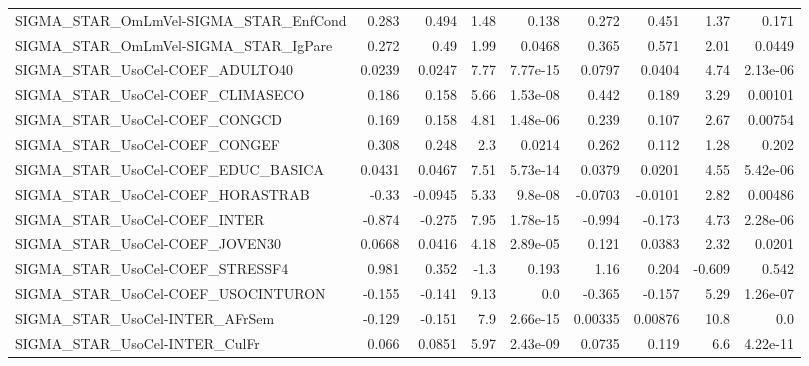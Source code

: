 \begin{tabular}{lrrrrrrrr}
SIGMA\_STAR\_OmLmVel-SIGMA\_STAR\_EnfCond &       0.283 &        0.494 &    1.48 &    0.138 &      0.272 &       0.451 &         1.37 &         0.171 \\
SIGMA\_STAR\_OmLmVel-SIGMA\_STAR\_IgPare  &       0.272 &         0.49 &    1.99 &   0.0468 &      0.365 &       0.571 &         2.01 &        0.0449 \\
SIGMA\_STAR\_UsoCel-COEF\_ADULTO40       &      0.0239 &       0.0247 &    7.77 & 7.77e-15 &     0.0797 &      0.0404 &         4.74 &      2.13e-06 \\
SIGMA\_STAR\_UsoCel-COEF\_CLIMASECO      &       0.186 &        0.158 &    5.66 & 1.53e-08 &      0.442 &       0.189 &         3.29 &       0.00101 \\
SIGMA\_STAR\_UsoCel-COEF\_CONGCD         &       0.169 &        0.158 &    4.81 & 1.48e-06 &      0.239 &       0.107 &         2.67 &       0.00754 \\
SIGMA\_STAR\_UsoCel-COEF\_CONGEF         &       0.308 &        0.248 &     2.3 &   0.0214 &      0.262 &       0.112 &         1.28 &         0.202 \\
SIGMA\_STAR\_UsoCel-COEF\_EDUC\_BASICA    &      0.0431 &       0.0467 &    7.51 & 5.73e-14 &     0.0379 &      0.0201 &         4.55 &      5.42e-06 \\
SIGMA\_STAR\_UsoCel-COEF\_HORASTRAB      &       -0.33 &      -0.0945 &    5.33 &  9.8e-08 &    -0.0703 &     -0.0101 &         2.82 &       0.00486 \\
SIGMA\_STAR\_UsoCel-COEF\_INTER          &      -0.874 &       -0.275 &    7.95 & 1.78e-15 &     -0.994 &      -0.173 &         4.73 &      2.28e-06 \\
SIGMA\_STAR\_UsoCel-COEF\_JOVEN30        &      0.0668 &       0.0416 &    4.18 & 2.89e-05 &      0.121 &      0.0383 &         2.32 &        0.0201 \\
SIGMA\_STAR\_UsoCel-COEF\_STRESSF4       &       0.981 &        0.352 &    -1.3 &    0.193 &       1.16 &       0.204 &       -0.609 &         0.542 \\
SIGMA\_STAR\_UsoCel-COEF\_USOCINTURON    &      -0.155 &       -0.141 &    9.13 &      0.0 &     -0.365 &      -0.157 &         5.29 &      1.26e-07 \\
SIGMA\_STAR\_UsoCel-INTER\_AFrSem        &      -0.129 &       -0.151 &     7.9 & 2.66e-15 &    0.00335 &     0.00876 &         10.8 &           0.0 \\
SIGMA\_STAR\_UsoCel-INTER\_CulFr         &       0.066 &       0.0851 &    5.97 & 2.43e-09 &     0.0735 &       0.119 &          6.6 &      4.22e-11 \\

\end{tabular}
